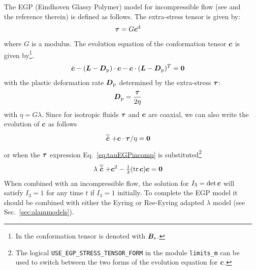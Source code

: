 The EGP (Eindhoven Glassy Polymer) model for incompressible flow (see \cite{pagani_no_2024} and the reference therein) is defined as follows.
The extra-stress tensor is given by:
\begin{equation}
     \boldsymbol{\tau}=G\boldsymbol{c}^{\text{d}}
     \label{eq:tauEGPincomp}
\end{equation}
where $G$ is a modulus. The evolution equation of the conformation tensor $\boldsymbol{c}$ is given by\footnote{In \cite{pagani_no_2024} the conformation tensor is denoted with $\boldsymbol{B}_\text{e}$.}.
\begin{equation}
  \dot{\boldsymbol{c}} -(\boldsymbol{L}-\boldsymbol{D}_\text{p})\cdot\boldsymbol{c}
                    -\boldsymbol{c}\cdot(\boldsymbol{L}-\boldsymbol{D}_\text{p})^T=\boldsymbol{0}
\end{equation}
with the plastic deformation rate $\boldsymbol{D}_\text{p}$ determined by the extra-stress $\boldsymbol{\tau}$:
\[
    \boldsymbol{D}_\text{p}=\frac{\boldsymbol{\tau}}{2\eta}
\]
with $\eta=G\lambda$. Since for isotropic fluids $\boldsymbol{\tau}$ and $\boldsymbol{c}$ are coaxial, we can also write
the evolution of $\boldsymbol{c}$ as follows
\begin{equation}
  \stackrel{\scriptscriptstyle\bigtriangledown}{\boldsymbol{c}} + \boldsymbol{c}\cdot\boldsymbol{\tau}/\eta=\boldsymbol{0}
\end{equation}
or when the $\boldsymbol{\tau}$ expression Eq.~\eqref{eq:tauEGPincomp} is
substituted\footnote{The logical \texttt{USE\_EGP\_STRESS\_TENSOR\_FORM} in the module \texttt{limits\_m} can be used to switch between the two forms of the evolution equation for $\boldsymbol{c}$.}
\begin{equation}
  \lambda\stackrel{\scriptscriptstyle\bigtriangledown}{\boldsymbol{c}} + \boldsymbol{c}^2 -\tfrac13(\operatorname{tr}\boldsymbol{c})\boldsymbol{c}=\boldsymbol{0}
\end{equation}
 When combined with an incompressible flow, the solution for $I_3=\det\boldsymbol{c}$ will satisfy $I_3=1$ for any time $t$ if $I_3=1$ initially. To complete the EGP model it should be combined with either the Eyring or Ree-Eyring adapted $\lambda$ model (see Sec.~\ref{sec:alammodels}). 


